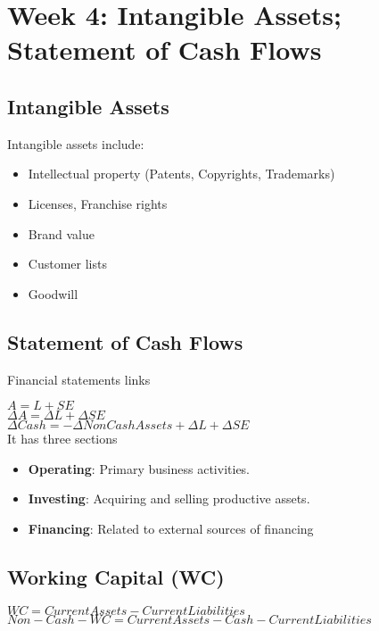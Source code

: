 \section*{Week 4: Intangible Assets; Statement of Cash Flows}

\subsection*{Intangible Assets}


Intangible assets include:
\begin{itemize}[noitemsep,topsep=0pt]
	\item Intellectual property (Patents, Copyrights, Trademarks)
	\item Licenses, Franchise rights
	\item Brand value
	\item Customer lists
	\item Goodwill
\end{itemize}


\subsection*{Statement of Cash Flows}

Financial statements links

$A = L  + SE$ \\
$\Delta A = \Delta L + \Delta SE $ \\
$\Delta Cash = - \Delta NonCashAssets + \Delta L + \Delta SE $ \\

It has three sections

\begin{itemize}[noitemsep,topsep=0pt]
	\item \textbf{Operating}: Primary business activities.
	\item \textbf{Investing}: Acquiring and selling productive assets.
	\item \textbf{Financing}: Related to external sources of financing
\end{itemize}


\subsection*{Working Capital (WC)}


$WC = CurrentAssets - CurrentLiabilities$ \\
$Non-Cash-WC = CurrentAssets - Cash - CurrentLiabilities $ \\

